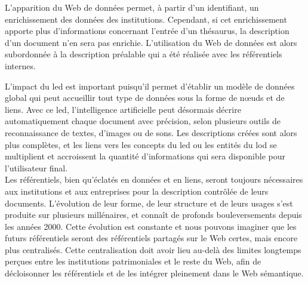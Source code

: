 \noindent L'apparition du Web de données permet, à partir d'un identifiant, un enrichissement des données des institutions. Cependant, si cet enrichissement apporte plus d'informations concernant l'entrée d'un thésaurus, la description d'un document n'en sera pas enrichie. L'utilisation du Web de données est alors subordonnée à la description préalable qui a été réalisée avec les référentiels internes.

\noindent L'impact du \ac*{led} est important puisqu'il permet d'établir un modèle de données global qui peut accueillir tout type de données sous la forme de nœuds et de liens. Avec ce \ac{led}, l'intelligence artificielle peut désormais décrire automatiquement chaque document avec précision, selon plusieurs outils de reconnaissance de textes, d'images ou de sons. Les descriptions créées sont alors plus complètes, et les liens vers les concepts du \ac{led} ou les entités du \ac*{lod} se multiplient et accroissent la quantité d'informations qui sera disponible pour l'utilisateur final.\\

Les référentiels, bien qu'éclatés en données et en liens, seront toujours nécessaires aux institutions et aux entreprises pour la description contrôlée de leurs documents. L'évolution de leur forme, de leur structure et de leurs usages s'est produite sur plusieurs millénaires, et connaît de profonds bouleversements depuis les années 2000. Cette évolution est constante et nous pouvons imaginer que les futurs référentiels seront des référentiels partagés sur le Web certes, mais encore plus centralisés. Cette centralisation doit avoir lieu au-delà des limites longtemps perçues entre les institutions patrimoniales et le reste du Web, afin de décloisonner les référentiels et de les intégrer pleinement dans le Web sémantique.